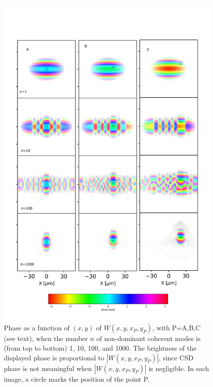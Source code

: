 \documentclass{iucr}              %
\begin{document}
\begin{figure}\label{pointP}%
\caption{Phase as a function of $(x,y)$ of $W(x,y,x_P,y_P)$, with P=A,B,C (see text), when the number $n$ of non-dominant coherent modes is (from top to bottom) 1, 10, 100, and 1000. The brightness of the displayed phase is proportional to $|W(x,y,x_P,y_P)|$, since CSD phase is not meaningful when $|W(x,y,x_P,y_P)|$ is negligible. In each image, a circle marks the position of the point P.}
\includegraphics[width=1.0\textwidth]{Figures/vx_id16a_ABC.png}
\end{figure}
\end{document}
